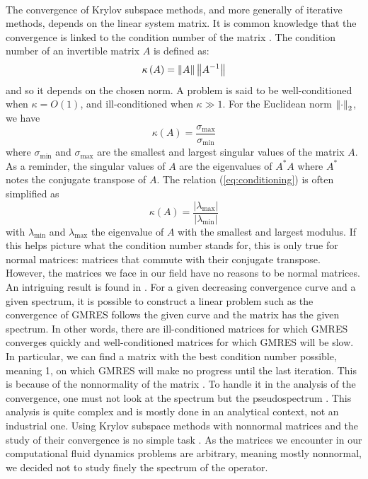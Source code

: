       \paragraph{}
      The convergence of Krylov subspace methods, and more generally of iterative methods, depends on the linear system matrix.
      It is common knowledge that the convergence is linked to the condition number of the matrix \cite{Nevanlinna1994}.
      The condition number of an invertible matrix $A$ is defined as:
      \begin{equation}
        \kappa\left( A \right) = \norm{A} \norm{A^{-1}}
      \end{equation}
      and so it depends on the chosen norm.
      A problem is said to be well-conditioned when $\kappa = O\left(1\right)$, and ill-conditioned when $\kappa \gg 1$.
      For the Euclidean norm $\norm[2]{\cdot}$, we have
  		\begin{equation}\label{eq:conditioning}
  			\kappa\left( A \right) = \frac{\sigma_{\max}}{\sigma_{\min}}
  		\end{equation}
      where $\sigma_{\min}$ and $\sigma_{\max}$ are the smallest and largest singular values of the matrix $A$.
      As a reminder, the singular values of $A$ are the eigenvalues of $A^* A$ where $A^*$ notes the conjugate transpose of $A$.
      The relation (\ref{eq:conditioning}) is often simplified as
      \begin{equation}
        \kappa\left( A \right) = \frac{\left|\lambda_{\max}\right|}{\left|\lambda_{\min}\right|}
      \end{equation}
      with $\lambda_{\min}$ and $\lambda_{\max}$ the eigenvalue of $A$ with the smallest and largest modulus.
      If this helps picture what the condition number stands for, this is only true for normal matrices: matrices that commute with their conjugate transpose.
      However, the matrices we face in our field have no reasons to be normal matrices.
      An intriguing result is found in \cite{GreenbaumPtakStrakos1996}.
      For a given decreasing convergence curve and a given spectrum, it is possible to construct a linear problem such as the convergence of GMRES follows the given curve and the matrix has the given spectrum.
      In other words, there are ill-conditioned matrices for which GMRES converges quickly and well-conditioned matrices for which GMRES will be slow.
      In particular, we can find a matrix with the best condition number possible, meaning 1, on which GMRES will make no progress until the last iteration.
      This is because of the nonnormality of the matrix \cite{GreenbaumStrakos1994, GreenbaumPtakStrakos1996}.
      To handle it in the analysis of the convergence, one must not look at the spectrum but the pseudospectrum \cite{Trefethen1991, Trefethen1999}.
      This analysis is quite complex and is mostly done in an analytical context, not an industrial one.
      Using Krylov subspace methods with nonnormal matrices and the study of their convergence is no simple task \cite{LiesenTichy2004, Huhtanen2005}.
      As the matrices we encounter in our computational fluid dynamics problems are arbitrary, meaning mostly nonnormal, we decided not to study finely the spectrum of the operator.

